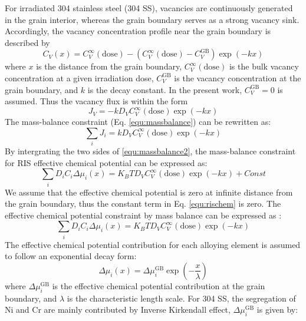 \documentclass[12pt]{article}
\begin{document}
For irradiated 304 stainless steel (304 SS), vacancies are continuously generated in the grain interior, whereas the grain boundary serves as a strong vacancy sink. Accordingly, the vacancy concentration profile near the grain boundary is described by
\begin{equation}\label{equ:vacconcprof}
C_V(x) = C_V^{\infty}(\mathrm{dose}) - \left(C_V^{\infty}(\mathrm{dose}) - C_V^{\mathrm{GB}}\right)\exp(-kx)
\end{equation}
where \(x\) is the distance from the grain boundary, \(C_V^{\infty}(\mathrm{dose})\) is the bulk vacancy concentration at a given irradiation dose, \(C_V^{\mathrm{GB}}\) is the vacancy concentration at the grain boundary, and \(k\) is the decay constant. In the present work, \(C_V^{\mathrm{GB}} = 0\) is assumed. Thus the vacancy flux is within the form
\begin{equation}\label{equ:vacflux}
J_V = -k D_V C_V^{\infty}(\mathrm{dose}) \exp(-kx)
\end{equation}
The mass-balance constraint (Eq. \ref{equ:massbalance}) can be rewritten as:
\begin{equation}\label{equ:massbalance2}
\sum_i J_i = k D_V C_V^{\infty}(\mathrm{dose}) \exp(-kx)
\end{equation}
By intergrating the two sides of \ref{equ:massbalance2}, the mass-balance constraint for RIS effective chemical potential can be expressed as:
\begin{equation} \label {equ:rischem}
\sum_i D_i C_i \Delta \mu_i(x) = K_B T D_V C_V^{\infty}(\mathrm{dose}) \exp(-kx) + Const
\end{equation}
We assume that the effective chemical potential is zero at infinite distance from the grain boundary, thus the constant term in Eq. \ref{equ:rischem} is zero. The effective chemical potential constraint by mass balance can be expressed as :
\begin{equation} \label{equ:risfinal}
\sum_i D_i C_i \Delta \mu_i(x) = K_B T D_V C_V^{\infty}(\mathrm{dose}) \exp(-kx)
\end{equation}
The effective chemical potential contribution for each alloying element is assumed to follow an exponential decay form:
\begin{equation}\label{equ:chemipot}
\Delta \mu_i(x) = \Delta \mu_i^{\mathrm{GB}} \exp\left(-\frac{x}{\lambda}\right)
\end{equation}
where \(\Delta \mu_i^{\mathrm{GB}}\) is the effective chemical potential contribution at the grain boundary, and \(\lambda\) is the characteristic length scale. For 304 SS,  the  segregation of Ni and Cr are mainly contributed by Inverse Kirkendall effect, \(\Delta \mu_i^{\mathrm{GB}}\) is given by:
\end{document}
